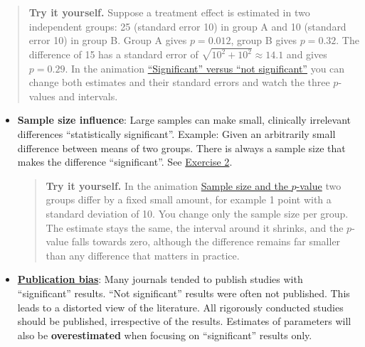 \documentclass[
]{book}
\begin{document}
\begin{quote}
\textbf{Try it yourself.} Suppose a treatment effect is estimated in two independent groups:
25 (standard error 10) in group A and 10 (standard error 10) in group B.
Group A gives \(p = 0.012\), group B gives \(p = 0.32\).
The difference of 15 has a standard error of \(\sqrt{10^2 + 10^2} \approx 14.1\) and gives \(p = 0.29\).
In the animation
\href{https://jdegenfellner.github.io/Script_QM1_ZHAW/animations/24_Signifikant_Nicht_Signifikant_Differenz.html}{``Significant'' versus ``not significant''}
you can change both estimates and their standard errors and watch the three \(p\)-values and intervals.
\end{quote}

\begin{itemize}
\item
  \textbf{Sample size influence}: Large samples can make small, clinically irrelevant
  differences ``statistically significant''. Example: Given an arbitrarily small difference between means of two groups. There is
  always a sample size that makes the difference ``significant''. See \hyperref[exercise2_nhst]{Exercise 2}.

  \begin{quote}
  \textbf{Try it yourself.} In the animation
  \href{https://jdegenfellner.github.io/Script_QM1_ZHAW/animations/25_Stichprobengroesse_p_Wert.html}{Sample size and the \(p\)-value}
  two groups differ by a fixed small amount, for example 1 point with a standard deviation of 10.
  You change only the sample size per group. The estimate stays the same, the interval around it
  shrinks, and the \(p\)-value falls towards zero, although the difference remains far smaller
  than any difference that matters in practice.
  \end{quote}
\item
  \textbf{\href{https://en.wikipedia.org/wiki/Publication_bias}{Publication bias}}: Many journals tended to publish studies with ``significant'' results. ``Not significant'' results
  were often not published. This leads to a distorted view of the literature. All rigorously
  conducted studies should be published, irrespective of the results. Estimates of parameters will also be \textbf{overestimated}
  when focusing on ``significant'' results only.


\end{itemize}
\end{document}

